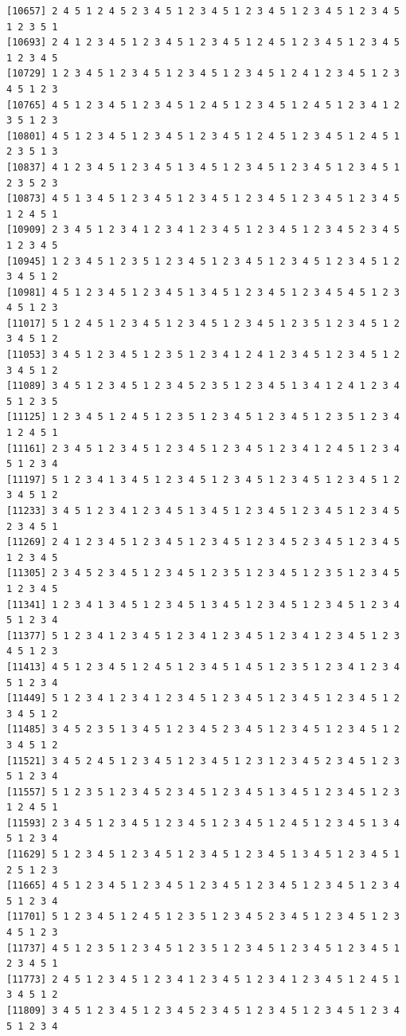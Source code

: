\documentclass[
  english,
]{book}
\begin{document}
\begin{verbatim}
[10657] 2 4 5 1 2 4 5 2 3 4 5 1 2 3 4 5 1 2 3 4 5 1 2 3 4 5 1 2 3 4 5 1 2 3 5 1
[10693] 2 4 1 2 3 4 5 1 2 3 4 5 1 2 3 4 5 1 2 4 5 1 2 3 4 5 1 2 3 4 5 1 2 3 4 5
[10729] 1 2 3 4 5 1 2 3 4 5 1 2 3 4 5 1 2 3 4 5 1 2 4 1 2 3 4 5 1 2 3 4 5 1 2 3
[10765] 4 5 1 2 3 4 5 1 2 3 4 5 1 2 4 5 1 2 3 4 5 1 2 4 5 1 2 3 4 1 2 3 5 1 2 3
[10801] 4 5 1 2 3 4 5 1 2 3 4 5 1 2 3 4 5 1 2 4 5 1 2 3 4 5 1 2 4 5 1 2 3 5 1 3
[10837] 4 1 2 3 4 5 1 2 3 4 5 1 3 4 5 1 2 3 4 5 1 2 3 4 5 1 2 3 4 5 1 2 3 5 2 3
[10873] 4 5 1 3 4 5 1 2 3 4 5 1 2 3 4 5 1 2 3 4 5 1 2 3 4 5 1 2 3 4 5 1 2 4 5 1
[10909] 2 3 4 5 1 2 3 4 1 2 3 4 1 2 3 4 5 1 2 3 4 5 1 2 3 4 5 2 3 4 5 1 2 3 4 5
[10945] 1 2 3 4 5 1 2 3 5 1 2 3 4 5 1 2 3 4 5 1 2 3 4 5 1 2 3 4 5 1 2 3 4 5 1 2
[10981] 4 5 1 2 3 4 5 1 2 3 4 5 1 3 4 5 1 2 3 4 5 1 2 3 4 5 4 5 1 2 3 4 5 1 2 3
[11017] 5 1 2 4 5 1 2 3 4 5 1 2 3 4 5 1 2 3 4 5 1 2 3 5 1 2 3 4 5 1 2 3 4 5 1 2
[11053] 3 4 5 1 2 3 4 5 1 2 3 5 1 2 3 4 1 2 4 1 2 3 4 5 1 2 3 4 5 1 2 3 4 5 1 2
[11089] 3 4 5 1 2 3 4 5 1 2 3 4 5 2 3 5 1 2 3 4 5 1 3 4 1 2 4 1 2 3 4 5 1 2 3 5
[11125] 1 2 3 4 5 1 2 4 5 1 2 3 5 1 2 3 4 5 1 2 3 4 5 1 2 3 5 1 2 3 4 1 2 4 5 1
[11161] 2 3 4 5 1 2 3 4 5 1 2 3 4 5 1 2 3 4 5 1 2 3 4 1 2 4 5 1 2 3 4 5 1 2 3 4
[11197] 5 1 2 3 4 1 3 4 5 1 2 3 4 5 1 2 3 4 5 1 2 3 4 5 1 2 3 4 5 1 2 3 4 5 1 2
[11233] 3 4 5 1 2 3 4 1 2 3 4 5 1 3 4 5 1 2 3 4 5 1 2 3 4 5 1 2 3 4 5 2 3 4 5 1
[11269] 2 4 1 2 3 4 5 1 2 3 4 5 1 2 3 4 5 1 2 3 4 5 2 3 4 5 1 2 3 4 5 1 2 3 4 5
[11305] 2 3 4 5 2 3 4 5 1 2 3 4 5 1 2 3 5 1 2 3 4 5 1 2 3 5 1 2 3 4 5 1 2 3 4 5
[11341] 1 2 3 4 1 3 4 5 1 2 3 4 5 1 3 4 5 1 2 3 4 5 1 2 3 4 5 1 2 3 4 5 1 2 3 4
[11377] 5 1 2 3 4 1 2 3 4 5 1 2 3 4 1 2 3 4 5 1 2 3 4 1 2 3 4 5 1 2 3 4 5 1 2 3
[11413] 4 5 1 2 3 4 5 1 2 4 5 1 2 3 4 5 1 4 5 1 2 3 5 1 2 3 4 1 2 3 4 5 1 2 3 4
[11449] 5 1 2 3 4 1 2 3 4 1 2 3 4 5 1 2 3 4 5 1 2 3 4 5 1 2 3 4 5 1 2 3 4 5 1 2
[11485] 3 4 5 2 3 5 1 3 4 5 1 2 3 4 5 2 3 4 5 1 2 3 4 5 1 2 3 4 5 1 2 3 4 5 1 2
[11521] 3 4 5 2 4 5 1 2 3 4 5 1 2 3 4 5 1 2 3 1 2 3 4 5 2 3 4 5 1 2 3 5 1 2 3 4
[11557] 5 1 2 3 5 1 2 3 4 5 2 3 4 5 1 2 3 4 5 1 3 4 5 1 2 3 4 5 1 2 3 1 2 4 5 1
[11593] 2 3 4 5 1 2 3 4 5 1 2 3 4 5 1 2 3 4 5 1 2 4 5 1 2 3 4 5 1 3 4 5 1 2 3 4
[11629] 5 1 2 3 4 5 1 2 3 4 5 1 2 3 4 5 1 2 3 4 5 1 3 4 5 1 2 3 4 5 1 2 5 1 2 3
[11665] 4 5 1 2 3 4 5 1 2 3 4 5 1 2 3 4 5 1 2 3 4 5 1 2 3 4 5 1 2 3 4 5 1 2 3 4
[11701] 5 1 2 3 4 5 1 2 4 5 1 2 3 5 1 2 3 4 5 2 3 4 5 1 2 3 4 5 1 2 3 4 5 1 2 3
[11737] 4 5 1 2 3 5 1 2 3 4 5 1 2 3 5 1 2 3 4 5 1 2 3 4 5 1 2 3 4 5 1 2 3 4 5 1
[11773] 2 4 5 1 2 3 4 5 1 2 3 4 1 2 3 4 5 1 2 3 4 1 2 3 4 5 1 2 4 5 1 3 4 5 1 2
[11809] 3 4 5 1 2 3 4 5 1 2 3 4 5 2 3 4 5 1 2 3 4 5 1 2 3 4 5 1 2 3 4 5 1 2 3 4

\end{verbatim}
\end{document}
